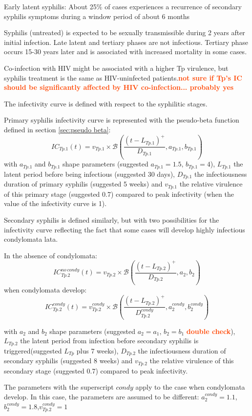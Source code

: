\documentclass[11pt, onecolumn]{article}
\newcommand{\warning}[1]{\textbf{\textcolor{OrangeRed}{#1}}}
\begin{document}
Early latent syphilis: About 25\% of cases experiences a recurrence of secondary syphilis symptoms during a window period of about 6 months

Syphilis (untreated) is expected to be sexually transmissible during 2 years after initial infection\cite{Horvath:2011fw}. Late latent and tertiary phases are not infectious. Tertiary phase occurs 15-30 years later and is associated with increased mortality in some cases. 

Co-infection with HIV might be associated with a higher Tp virulence, but syphilis treatment is the same as HIV-uninfected patients\cite{Kent:2008ch}.\warning{not sure if Tp's IC should be significantly affected by HIV co-infection... probably yes}

The infectivity curve is defined with respect to the syphilitic stages.

Primary syphilis infectivity curve is represented with the pseudo-beta function defined in section \ref{sec:pseudo beta}:
$$IC_{Tp.1}(t) = v_{Tp.1}\times\mathcal{B} \left(\frac{(t-L_{Tp.1})^
+}{D_{Tp.1}}, a_{Tp.1},b_{Tp.1} \right) $$
with $a_{Tp.1}$ and $b_{Tp.1}$ shape parameters (suggested $a_{Tp.1}=1.5$, $b_{Tp.1} = 4$), $L_{Tp.1}$ the latent period before being infectious (suggested 30 days), $D_{Tp.1}$ the infectiousness duration of primary syphilis (suggested 5 weeks) and $v_{Tp.1}$ the relative virulence of this primary stage (suggested 0.7) compared to peak infectivity (when the value of the infectivity curve is 1).

Secondary syphilis is defined similarly, but with two possibilities for the infectivity curve reflecting the fact that some cases will develop highly infectious condylomata lata.

In the absence of condylomata:
$$IC_{Tp.2}^{no\,condy}(t) = v_{Tp.2}\times\mathcal{B} \left(\frac{(t-L_{Tp.2})^
+}{D_{Tp.2}}, a_2,b_2 \right) $$
when condylomata develop:
$$IC_{Tp.2}^{condy}(t) = v_{Tp.2}^{condy}\times\mathcal{B} \left(\frac{(t-L_{Tp.2})^
+}{D_{Tp.2}^{condy}}, a_2^{condy},b_2^{condy} \right) $$

with $a_2$ and $b_2$ shape parameters (suggested $a_2=a_1$, $b_2 = b_1$ \warning{double check}), $L_{Tp.2}$ the latent period from infection before secondary syphilis is triggered(suggested $L_{Tp}$ plus 7 weeks), $D_{Tp.2}$ the infectiousness duration of secondary syphilis (suggested 8 weeks) and $v_{Tp.2}$ the relative virulence of this secondary stage (suggested 0.7) compared to peak infectivity. 

The parameters with the superscript $condy$ apply to the case when condylomata develop. In this case, the parameters are assumed to be different:  $a_2^{condy}=1.1$, $b_2^{condy}=1.8$,$ v_{Tp.2}^{condy}=1$
\end{document}
